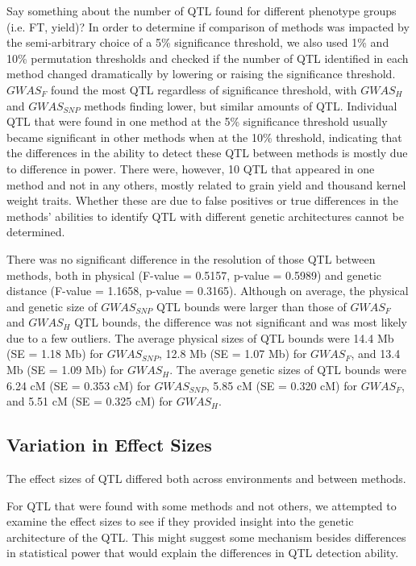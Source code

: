 \documentclass[article,9pt,twocolumn,twoside]{rilabRxiv}
\begin{document}
Say something about the number of QTL found for different phenotype groups (i.e. FT, yield)?
In order to determine if comparison of methods was impacted by the semi-arbitrary choice of a 5\% significance threshold, we also used 1\% and 10\% permutation thresholds and checked if the number of QTL identified in each method changed dramatically by lowering or raising the significance threshold. $GWAS_F$ found the most QTL regardless of significance threshold, with $GWAS_H$ and $GWAS_{SNP}$ methods finding lower, but similar amounts of QTL. Individual QTL that were found in one method at the 5\% significance threshold usually became significant in other methods when at the 10\% threshold, indicating that the differences in the ability to detect these QTL between methods is mostly due to difference in power. There were, however, 10 QTL that appeared in one method and not in any others, mostly related to grain yield and thousand kernel weight traits. Whether these are due to false positives or true differences in the methods' abilities to identify QTL with different genetic architectures cannot be determined.

There was no significant difference in the resolution of those QTL between methods, both in physical (F-value = 0.5157, p-value = 0.5989) and genetic distance (F-value = 1.1658, p-value = 0.3165). Although on average, the physical and genetic size of $GWAS_{SNP}$ QTL bounds were larger than those of $GWAS_F$ and $GWAS_H$ QTL bounds, the difference was not significant and was most likely due to a few outliers. The average physical sizes of QTL bounds were 14.4 Mb (SE = 1.18 Mb) for $GWAS_{SNP}$, 12.8 Mb (SE = 1.07 Mb) for $GWAS_F$, and 13.4 Mb (SE = 1.09 Mb) for $GWAS_H$. The average genetic sizes of QTL bounds were 6.24 cM (SE = 0.353 cM) for $GWAS_{SNP}$, 5.85 cM (SE = 0.320 cM) for $GWAS_F$, and 5.51 cM (SE = 0.325 cM) for $GWAS_H$.

\subsection{Variation in Effect Sizes}
The effect sizes of QTL differed both across environments and between methods.

For QTL that were found with some methods and not others, we attempted to examine the effect sizes to see if they provided insight into the genetic architecture of the QTL. This might suggest some mechanism besides differences in statistical power that would explain the differences in QTL detection ability.
\end{document}
